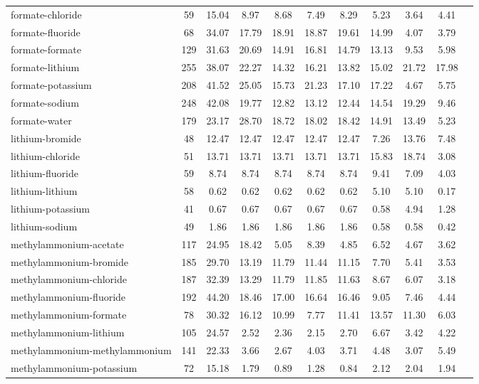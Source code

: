 \begin{longtable}{lcccccccccc}
formate-chloride & 59  & 15.04 & 8.97 & 8.68 & 7.49 & 8.29 & 5.23 & 3.64 & 4.41\\
formate-fluoride & 68  & 34.07 & 17.79 & 18.91 & 18.87 & 19.61 & 14.99 & 4.07 & 3.79\\
formate-formate & 129  & 31.63 & 20.69 & 14.91 & 16.81 & 14.79 & 13.13 & 9.53 & 5.98\\
formate-lithium & 255  & 38.07 & 22.27 & 14.32 & 16.21 & 13.82 & 15.02 & 21.72 & 17.98\\
formate-potassium & 208  & 41.52 & 25.05 & 15.73 & 21.23 & 17.10 & 17.22 & 4.67 & 5.75\\
formate-sodium & 248  & 42.08 & 19.77 & 12.82 & 13.12 & 12.44 & 14.54 & 19.29 & 9.46\\
formate-water & 179  & 23.17 & 28.70 & 18.72 & 18.02 & 18.42 & 14.91 & 13.49 & 5.23\\
lithium-bromide & 48  & 12.47 & 12.47 & 12.47 & 12.47 & 12.47 & 7.26 & 13.76 & 7.48\\
lithium-chloride & 51  & 13.71 & 13.71 & 13.71 & 13.71 & 13.71 & 15.83 & 18.74 & 3.08\\
lithium-fluoride & 59  & 8.74 & 8.74 & 8.74 & 8.74 & 8.74 & 9.41 & 7.09 & 4.03\\
lithium-lithium & 58  & 0.62 & 0.62 & 0.62 & 0.62 & 0.62 & 5.10 & 5.10 & 0.17\\
lithium-potassium & 41  & 0.67 & 0.67 & 0.67 & 0.67 & 0.67 & 0.58 & 4.94 & 1.28\\
lithium-sodium & 49  & 1.86 & 1.86 & 1.86 & 1.86 & 1.86 & 0.58 & 0.58 & 0.42\\
methylammonium-acetate & 117  & 24.95 & 18.42 & 5.05 & 8.39 & 4.85 & 6.52 & 4.67 & 3.62\\
methylammonium-bromide & 185  & 29.70 & 13.19 & 11.79 & 11.44 & 11.15 & 7.70 & 5.41 & 3.53\\
methylammonium-chloride & 187  & 32.39 & 13.29 & 11.79 & 11.85 & 11.63 & 8.67 & 6.07 & 3.18\\
methylammonium-fluoride & 192  & 44.20 & 18.46 & 17.00 & 16.64 & 16.46 & 9.05 & 7.46 & 4.44\\
methylammonium-formate & 78  & 30.32 & 16.12 & 10.99 & 7.77 & 11.41 & 13.57 & 11.30 & 6.03\\
methylammonium-lithium & 105  & 24.57 & 2.52 & 2.36 & 2.15 & 2.70 & 6.67 & 3.42 & 4.22\\
methylammonium-methylammonium & 141  & 22.33 & 3.66 & 2.67 & 4.03 & 3.71 & 4.48 & 3.07 & 5.49\\
methylammonium-potassium & 72  & 15.18 & 1.79 & 0.89 & 1.28 & 0.84 & 2.12 & 2.04 & 1.94\\

\end{longtable}
